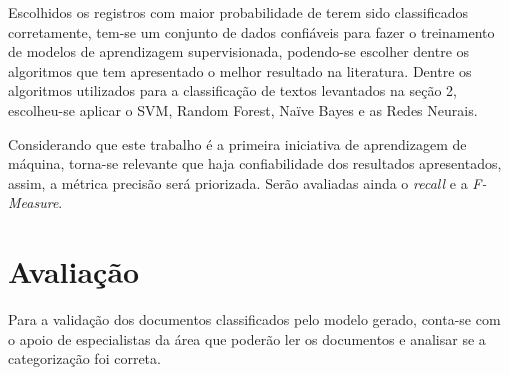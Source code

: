 Escolhidos os registros com maior probabilidade de terem sido classificados corretamente, tem-se um conjunto de dados confiáveis para fazer o treinamento de modelos de aprendizagem supervisionada, podendo-se escolher dentre os algoritmos que tem apresentado o melhor resultado na literatura. Dentre os algoritmos utilizados para a classificação de textos levantados na seção 2, escolheu-se aplicar o SVM, Random Forest, Naïve Bayes e as Redes Neurais. 


Considerando que este trabalho é a primeira iniciativa de aprendizagem de máquina, torna-se relevante que haja confiabilidade dos resultados apresentados, assim, a métrica precisão será priorizada. Serão avaliadas ainda o \textit{recall} e a \textit{F-Measure}.






\section{Avaliação}%
Para a validação dos documentos classificados pelo modelo gerado, conta-se com o apoio de especialistas da área que poderão ler os documentos e analisar se a categorização foi correta. 

